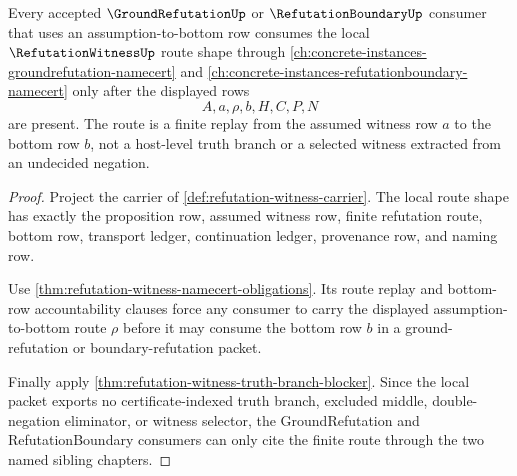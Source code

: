 \begin{theorem}
\label{thm:refutation-witness-ground-refutation-route-link}
Every accepted $\GroundRefutationUp$ or $\RefutationBoundaryUp$ consumer that uses an assumption-to-bottom row consumes the local $\RefutationWitnessUp$ route shape through \autoref{ch:concrete-instances-groundrefutation-namecert} and \autoref{ch:concrete-instances-refutationboundary-namecert} only after the displayed rows
$$
A,a,\rho,b,H,C,P,N
$$
are present. The route is a finite replay from the assumed witness row $a$ to the bottom row $b$, not a host-level truth branch or a selected witness extracted from an undecided negation.
\end{theorem}
\begin{proof}
Project the carrier of \autoref{def:refutation-witness-carrier}. The local route shape has exactly the proposition row, assumed witness row, finite refutation route, bottom row, transport ledger, continuation ledger, provenance row, and naming row.

Use \autoref{thm:refutation-witness-namecert-obligations}. Its route replay and bottom-row accountability clauses force any consumer to carry the displayed assumption-to-bottom route $\rho$ before it may consume the bottom row $b$ in a ground-refutation or boundary-refutation packet.

Finally apply \autoref{thm:refutation-witness-truth-branch-blocker}. Since the local packet exports no certificate-indexed truth branch, excluded middle, double-negation eliminator, or witness selector, the GroundRefutation and RefutationBoundary consumers can only cite the finite route through the two named sibling chapters.
\end{proof}

